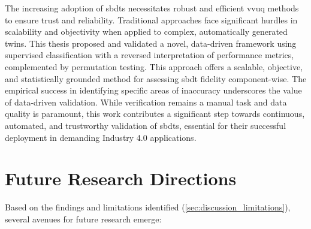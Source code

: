 The increasing adoption of \gls{sbdt}s necessitates robust and efficient \gls{vvuq} methods to ensure trust and reliability. Traditional approaches face significant hurdles in scalability and objectivity when applied to complex, automatically generated twins. This thesis proposed and validated a novel, data-driven framework using supervised classification with a reversed interpretation of performance metrics, complemented by permutation testing. This approach offers a scalable, objective, and statistically grounded method for assessing \gls{sbdt} fidelity component-wise. The empirical success in identifying specific areas of inaccuracy underscores the value of data-driven validation. While verification remains a manual task and data quality is paramount, this work contributes a significant step towards continuous, automated, and trustworthy validation of \gls{sbdt}s, essential for their successful deployment in demanding Industry 4.0 applications.

\section{Future Research Directions}
\label{sec:conclusion_future_work}

Based on the findings and limitations identified (\autoref{sec:discussion_limitations}), several avenues for future research emerge:

